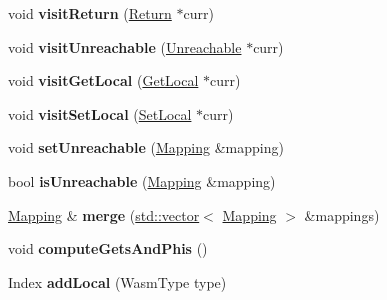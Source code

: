 \begin{DoxyCompactItemize}
void {\bfseries visit\+Return} (\mbox{\hyperlink{classwasm_1_1_return}{Return}} $\ast$curr)
\item 
\mbox{\label{structwasm_1_1_s_s_aify_a284a35097a6bbeebb525e1c34542531f}} 
void {\bfseries visit\+Unreachable} (\mbox{\hyperlink{classwasm_1_1_unreachable}{Unreachable}} $\ast$curr)
\item 
\mbox{\label{structwasm_1_1_s_s_aify_ac2409dad1ba05019b44c6e3b284bbc7c}} 
void {\bfseries visit\+Get\+Local} (\mbox{\hyperlink{classwasm_1_1_get_local}{Get\+Local}} $\ast$curr)
\item 
\mbox{\label{structwasm_1_1_s_s_aify_a3a6d71e511472b4e9888f9fbb4150d88}} 
void {\bfseries visit\+Set\+Local} (\mbox{\hyperlink{classwasm_1_1_set_local}{Set\+Local}} $\ast$curr)
\item 
\mbox{\label{structwasm_1_1_s_s_aify_ad8979065965253e49758b0642ea64be6}} 
void {\bfseries set\+Unreachable} (\mbox{\hyperlink{classstd_1_1vector}{Mapping}} \&mapping)
\item 
\mbox{\label{structwasm_1_1_s_s_aify_af834f52dce6138b3fdf3720dcc9e8f98}} 
bool {\bfseries is\+Unreachable} (\mbox{\hyperlink{classstd_1_1vector}{Mapping}} \&mapping)
\item 
\mbox{\label{structwasm_1_1_s_s_aify_a4ca5212d71d0d537a220905fc4089e97}} 
\mbox{\hyperlink{classstd_1_1vector}{Mapping}} \& {\bfseries merge} (\mbox{\hyperlink{classstd_1_1vector}{std\+::vector}}$<$ \mbox{\hyperlink{classstd_1_1vector}{Mapping}} $>$ \&mappings)
\item 
\mbox{\label{structwasm_1_1_s_s_aify_aa61f61f9d4e49d1b1a13faa21f8d75ca}} 
void {\bfseries compute\+Gets\+And\+Phis} ()
\item 
\mbox{\label{structwasm_1_1_s_s_aify_a5c3fcf7d50c3a22b903bb534f81adcf4}} 
Index {\bfseries add\+Local} (Wasm\+Type type)
\end{DoxyCompactItemize}
